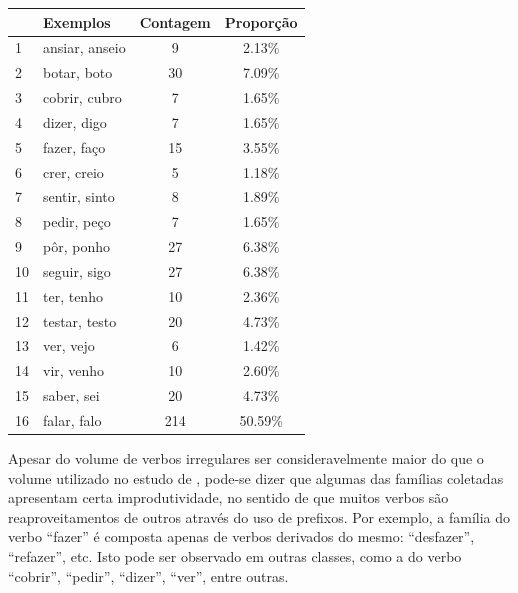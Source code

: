 \begin{table}[H]
\begin{center}
\begin{tabular}{|l|l|c|c|}
\toprule
 & Exemplos & Contagem & Proporção\\
\midrule
1  & ansiar, anseio & 9 & 2.13\%\\
2  & botar, boto & 30 & 7.09\%\\
3  & cobrir, cubro & 7 & 1.65\%\\
4  & dizer, digo & 7 & 1.65\%\\
5 & fazer, faço & 15 & 3.55\%\\
6  & crer, creio & 5 & 1.18\%\\
7  & sentir, sinto & 8 & 1.89\% \\
8  & pedir, peço & 7 & 1.65\%\\
9  & pôr, ponho & 27 & 6.38\%\\
10  & seguir, sigo & 27 & 6.38\%\\
11  & ter, tenho & 10 & 2.36\%\\
12  & testar, testo & 20 & 4.73\%\\
13  & ver, vejo & 6 & 1.42\%\\
14  & vir, venho & 10 & 2.60\%\\
15 & saber, sei & 20 & 4.73\%\\
16  & falar, falo & 214 & 50.59\%\\
\bottomrule
\end{tabular}
\end{center}
\label{tab:classes}
\end{table}

Apesar do volume de verbos irregulares ser consideravelmente maior do que o volume utilizado no estudo de \cite{rumelhart:1986}, pode-se dizer que algumas das famílias coletadas apresentam certa improdutividade, no sentido de que muitos verbos são reaproveitamentos de outros através do uso de prefixos. Por exemplo, a família do verbo “fazer” é composta apenas de verbos derivados do mesmo: “desfazer”, “refazer”, etc. Isto pode ser observado em outras classes, como a do verbo “cobrir”, “pedir”, “dizer”, “ver”, entre outras. %


